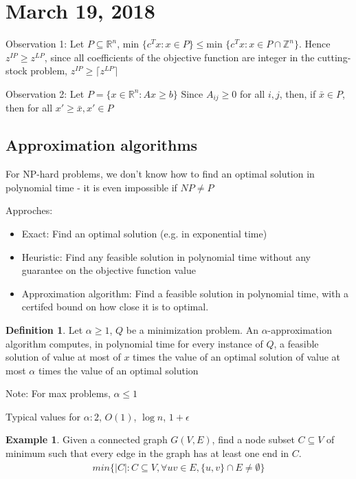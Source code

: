 \documentclass{article}
\theoremstyle{plain}
\theoremstyle{definition}
\newtheorem{eg}{Example}
\newtheorem{defn}{Definition}
\newcommand{\ceiling}[1]{\lceil #1 \rceil}
\begin{document}
\section{March 19, 2018}
Observation 1: Let $P\subseteq\mathbb{R}^n$,
$\text{min }\{c^Tx: x\in P\}\leq \text{min }\{c^Tx: x\in P\cap\mathbb{Z}^n\}$.
Hence $z^{IP} \geq z^{LP}$, since all coefficients of the objective function are
integer in the cutting-stock problem, $z^{IP} \geq \ceiling{z^{LP}}$

Observation 2:
Let $P = \{x\in\mathbb{R}^n: Ax\geq b\}$  Since $A_{ij}\geq 0$ for all $i, j$, then, if
$\bar{x}\in P$, then for all $x'\geq\bar{x}, x'\in P$

\subsection{Approximation algorithms}
For NP-hard problems, we don't know how to find an optimal solution in polynomial
time - it is even impossible if $NP\ne P$

Approches:
\begin{itemize}
    \item Exact: Find an optimal solution (e.g. in exponential time)
    \item Heuristic: Find any feasible solution in polynomial time without
        any guarantee on the objective function value
    \item Approximation algorithm: Find a feasible solution in polynomial time, with a
        certifed bound on how close it is to optimal.
\end{itemize}
\begin{defn}
    Let $\alpha\geq 1$, $Q$ be a minimization problem.
    An $\alpha$-approximation algorithm computes, in polynomial time
    for every instance of $Q$, a feasible
    solution of value at most of $x$ times the value of an optimal solution of value
    at most $\alpha$ times the value of an optimal solution
\end{defn}

Note: For max problems, $\alpha\leq 1$

Typical values for $\alpha: 2$, $O(1)$, $\log{n}$, $1+\epsilon$

\begin{eg}
    Given a connected graph $G(V, E)$, find a node subset $C\subseteq V$ of minimum
    such that every edge in the graph has at least one end in $C$.
    \begin{align*}
        min\{|C|: C\subseteq V, \forall uv\in E, \{u,v\}\cap E\ne \emptyset\}
    \end{align*}
\end{eg}
\end{document}
